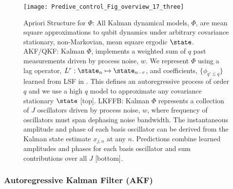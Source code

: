 \begin{figure} [h]
    \texttt{[image: Predive\_control\_Fig\_overview\_17\_three]}
    \caption{\label{Predive_control_Fig_overview_17_three} Apriori Structure for $\Phi$: All Kalman dynamical models, $\Phi$, are mean square approximations to qubit dynamics under arbitrary covariance stationary, non-Markovian, mean square ergodic $\state$. AKF/QKF: Kalman $\Phi$, implements a weighted sum of $q$ past measurements driven by process noise, $w$. We represent $\Phi$ using a lag operator, $L^r: \state_n \mapsto \state_{n-r}$, and coefficients, $ \{ \phi_{q' \leq q} \}$ learned from LSF in \cite{mavadia2017}. This defines an autoregressive process of order $q$ and we use a high $q$ model to approximate any covariance stationary $\state$ [top]. LKFFB: Kalman $\Phi$ represents a collection of $J$ oscillators driven by process noise, $w$, where frequency of oscillators must span dephasing noise bandwidth. The instantaneous amplitude and phase of each basis oscillator can be derived from the Kalman state estimate $x_{j, n}$ at any $n$. Predictions combine learned amplitudes and phases for each basis oscillator and sum contributions over all $J$ [bottom].}
\end{figure}

\subsubsection{Autoregressive Kalman Filter (AKF)}

